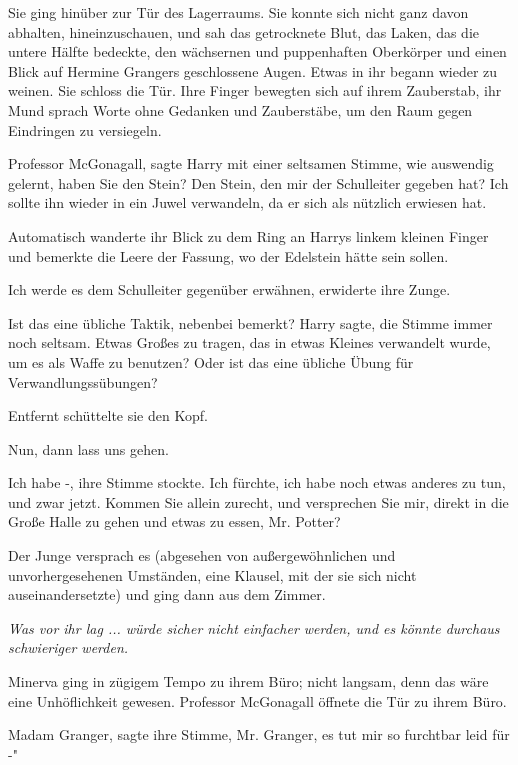 Sie ging hinüber zur Tür des Lagerraums. Sie konnte sich nicht ganz davon
abhalten, hineinzuschauen, und sah das getrocknete Blut, das Laken, das die
untere Hälfte bedeckte, den wächsernen und puppenhaften Oberkörper und einen
Blick auf Hermine Grangers geschlossene Augen. Etwas in ihr begann wieder zu
weinen. Sie schloss die Tür. Ihre Finger bewegten sich auf ihrem Zauberstab, ihr
Mund sprach Worte ohne Gedanken und Zauberstäbe, um den Raum gegen Eindringen zu
versiegeln.

\glqq Professor McGonagall\grqq{}, sagte Harry mit einer seltsamen Stimme, wie
auswendig gelernt, \glqq haben Sie den Stein? Den Stein, den mir der Schulleiter
gegeben hat? Ich sollte ihn wieder in ein Juwel verwandeln, da er sich als
nützlich erwiesen hat.\grqq{}

Automatisch wanderte ihr Blick zu dem Ring an Harrys linkem kleinen Finger und
bemerkte die Leere der Fassung, wo der Edelstein hätte sein sollen.

\glqq Ich werde es dem Schulleiter gegenüber erwähnen\grqq{}, erwiderte ihre
Zunge.

\glqq Ist das eine übliche Taktik, nebenbei bemerkt?\grqq{} Harry sagte, die
Stimme immer noch seltsam. \glqq Etwas Großes zu tragen, das in etwas Kleines
verwandelt wurde, um es als Waffe zu benutzen? Oder ist das eine übliche Übung
für Verwandlungssübungen?\grqq{}

Entfernt schüttelte sie den Kopf.

\glqq Nun, dann lass uns gehen.\grqq{}

\glqq Ich habe -\grqq{}, ihre Stimme stockte. \glqq Ich fürchte, ich habe noch
etwas anderes zu tun, und zwar jetzt. Kommen Sie allein zurecht, und versprechen
Sie mir, direkt in die Große Halle zu gehen und etwas zu essen, Mr. Potter?

Der Junge versprach es (abgesehen von außergewöhnlichen und unvorhergesehenen
Umständen, eine Klausel, mit der sie sich nicht auseinandersetzte) und ging dann
aus dem Zimmer.

\emph{Was vor ihr lag ... würde sicher nicht einfacher werden, und es könnte
durchaus schwieriger werden.}

Minerva ging in zügigem Tempo zu ihrem Büro; nicht langsam, denn das wäre eine
Unhöflichkeit gewesen. Professor McGonagall öffnete die Tür zu ihrem Büro.

\glqq Madam Granger\grqq{}, sagte ihre Stimme, \glqq Mr. Granger, es tut mir so
furchtbar leid für -"

